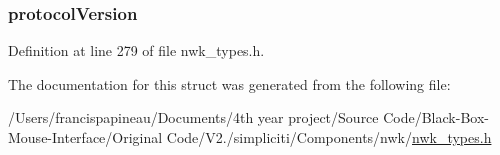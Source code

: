 \hypertarget{structsmplVersionInfo__t_a69ba4ce44c8b3df5af22db880cdb9c20}{
\subsubsection[{protocol\-Version}]{ {\bf protocol\-Version}}}\label{structsmplVersionInfo__t_a69ba4ce44c8b3df5af22db880cdb9c20}


\-Definition at line 279 of file nwk\-\_\-types.\-h.



\-The documentation for this struct was generated from the following file\-:\begin{DoxyCompactItemize}
\item 
/\-Users/francispapineau/\-Documents/4th year project/\-Source Code/\-Black-\/\-Box-\/\-Mouse-\/\-Interface/\-Original Code/\-V2./simpliciti/\-Components/nwk/\hyperlink{nwk__types_8h}{nwk\-\_\-types.\-h}\end{DoxyCompactItemize}
